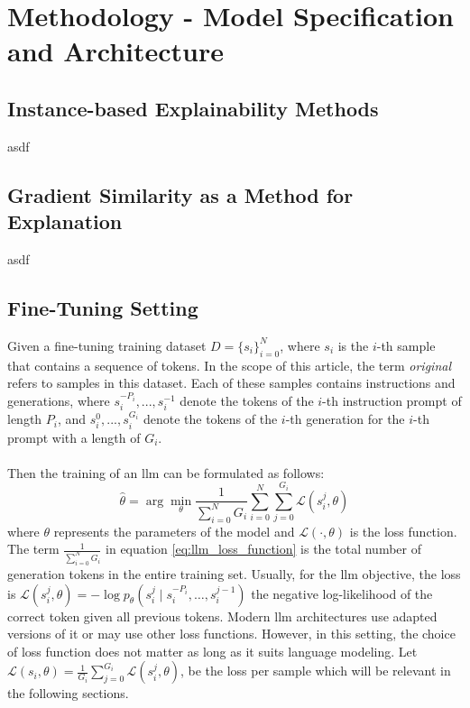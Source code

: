 \chapter{Methodology - Model Specification and Architecture}

\section{Instance-based Explainability Methods}
asdf
\section{Gradient Similarity as a Method for Explanation}
asdf

\section{Fine-Tuning Setting}
Given a fine-tuning training dataset $D = \{s_i\}_{i=0}^N$, where $s_i$ is the $i$-th sample that contains a sequence of tokens. In the scope of this article, the term \emph{original} refers to samples in this dataset. Each of these samples contains instructions and generations, where $s_i^{-P_i},...,s_i^{-1}$ denote the tokens of the $i$-th instruction prompt of length $P_i$, and $s_i^0,...,s_i^{G_i}$ denote the tokens of the $i$-th generation for the $i$-th prompt with a length of $G_i$.
\\\\
Then the training of an \acrshort{llm} can be formulated as follows: 
\begin{equation}
    \hat{\theta} = \arg\min_{\theta} \frac{1}{\sum_{i=0}^{N} G_i} \sum_{i=0}^{N} \sum_{j=0}^{G_i} \mathcal{L}(s_i^j, \theta)
    \label{eq:llm_loss_function}
\end{equation}
where $\theta$ represents the parameters of the model and $\mathcal{L}(\cdot, \theta)$ is the loss function. The term $\frac{1}{\sum_{i=0}^{N} G_i}$ in equation \ref{eq:llm_loss_function} is the total number of generation tokens in the entire training set. Usually, for the \acrshort{llm} objective, the loss is $\mathcal{L}(s_i^j, \theta) = -\log p_\theta(s_i^j \mid s_i^{-P_i}, \ldots, s_i^{j-1})$ the negative log-likelihood of the correct token given all previous tokens.  Modern \acrshort{llm} architectures use adapted versions of it or may use other loss functions. However, in this setting, the choice of loss function does not matter as long as it suits language modeling. Let $\mathcal{L}(s_i, \theta) = \frac{1}{G_i} \sum_{j=0}^{G_i} \mathcal{L}(s_i^j, \theta)$, be the loss per sample which will be relevant in the following sections.
